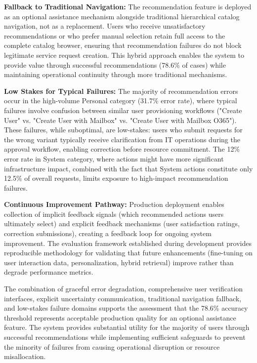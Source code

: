 \textbf{Fallback to Traditional Navigation:} The recommendation feature is deployed as an optional assistance mechanism alongside traditional hierarchical catalog navigation, not as a replacement. Users who receive unsatisfactory recommendations or who prefer manual selection retain full access to the complete catalog browser, ensuring that recommendation failures do not block legitimate service request creation. This hybrid approach enables the system to provide value through successful recommendations (78.6\% of cases) while maintaining operational continuity through more traditional mechanisms.

\textbf{Low Stakes for Typical Failures:} The majority of recommendation errors occur in the high-volume Personal category (31.7\% error rate), where typical failures involve confusion between similar user provisioning workflows ("Create User" vs. "Create User with Mailbox" vs. "Create User with Mailbox O365"). These failures, while suboptimal, are low-stakes: users who submit requests for the wrong variant typically receive clarification from IT operations during the approval workflow, enabling correction before resource commitment. The 12\% error rate in System category, where actions might have more significant infrastructure impact, combined with the fact that System actions constitute only 12.5\% of overall requests, limits exposure to high-impact recommendation failures.

\textbf{Continuous Improvement Pathway:} Production deployment enables collection of implicit feedback signals (which recommended actions users ultimately select) and explicit feedback mechanisms (user satisfaction ratings, correction submissions), creating a feedback loop for ongoing system improvement. The evaluation framework established during development provides reproducible methodology for validating that future enhancements (fine-tuning on user interaction data, personalization, hybrid retrieval) improve rather than degrade performance metrics.

The combination of graceful error degradation, comprehensive user verification interfaces, explicit uncertainty communication, traditional navigation fallback, and low-stakes failure domains supports the assessment that the 78.6\% accuracy threshold represents acceptable production quality for an optional assistance feature. The system provides substantial utility for the majority of users through successful recommendations while implementing sufficient safeguards to prevent the minority of failures from causing operational disruption or resource misallocation.

